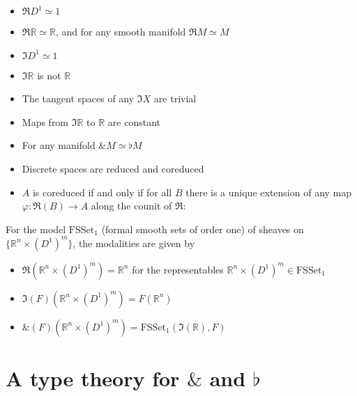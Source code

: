\documentclass[a4paper,12pt]{article}
\newcommand{\R}{\mathbb{R}}
\newcommand{\Red}{\Re}
\newcommand{\Cored}{\Im}
\newcommand{\Wat}{\&}
\begin{document}
\begin{itemize}
\item $\Red D^1 \simeq 1$
\item $\Red \R \simeq \R$, and for any smooth manifold $\Red M \simeq M$
\item $\Cored D^1 \simeq 1$
\item $\Cored \R$ is not $\R$
\item The tangent spaces of any $\Cored X$ are trivial
\item Maps from $\Cored \R$ to $\R$ are constant
\item For any manifold $\Wat M\simeq\flat M$
\item Discrete spaces are reduced and coreduced
\item $A$ is coreduced if and only if for all $B$ there is a unique extension of any map $\varphi\colon \Red(B)\to A$ along the counit of $\Red$:
\begin{center}
\end{center}
\end{itemize}
For the model $\mathrm{FSSet}_1$ (formal smooth sets of order one) of sheaves on $\{\R^n\times (D^1)^m \}$,
the modalities are given by
\begin{itemize}
\item $\Red(\R^n\times (D^1)^m)=\R^n$ for the representables $\R^n\times (D^1)^m\in\mathrm{FSSet}_1$
\item $\Cored(F)(\R^n\times (D^1)^m)=F(\R^n)$
\item $\Wat(F)(\R^n\times (D^1)^m)=\mathrm{FSSet}_1(\Cored(\R), F)$
\end{itemize}

\newpage
\section{A type theory for $\Wat$ and $\flat$}
\end{document}
